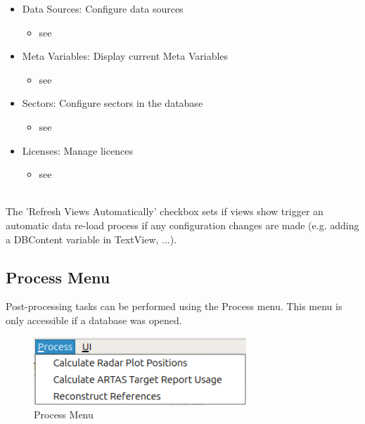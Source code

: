 \begin{itemize}
 \item Data Sources: Configure data sources
  \begin{itemize}
 \item see 
 \end{itemize}
 \item Meta Variables: Display current Meta Variables
  \begin{itemize}
 \item see 
 \end{itemize}
 \item Sectors: Configure sectors in the database
 \begin{itemize}
 \item see 
 \end{itemize}
  \item Licenses: Manage licences
 \begin{itemize}
 \item see 
 \end{itemize}
\end{itemize}
\  \\

The 'Refresh Views Automatically' checkbox sets if views show trigger an automatic data re-load process if any configuration changes are made (e.g. adding a DBContent variable in TextView, ...).

\subsection{Process Menu}
\label{sec:ui_overview_process_menu}

Post-processing tasks can be performed using the Process menu. This menu is only accessible if a database was opened.

\begin{figure}[H]
  \center
    \includegraphics[width=8cm,frame]{figures/ui_process_menu.png}
  \caption{Process Menu}
\end{figure}

